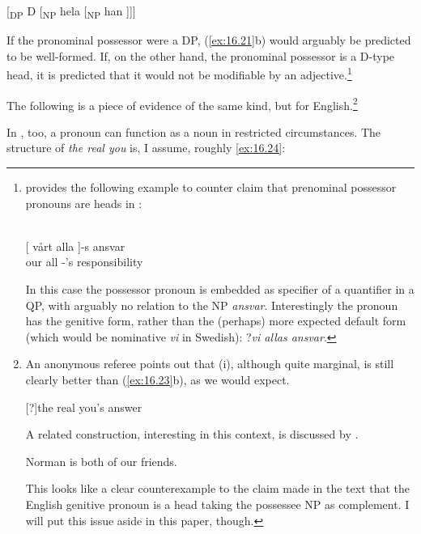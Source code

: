 \documentclass[output=paper]{langsci/langscibook}
\begin{document}
\ea\label{ex:16.22}
    {}[\textsubscript{DP} D [\textsubscript{NP} hela [\textsubscript{NP} han ]]]
\z

If the pronominal possessor were a DP, (\ref{ex:16.21}b) would arguably be
predicted to be well-formed. If, on the other hand, the pronominal possessor is
a D-type head, it is predicted that it would not be modifiable by an
adjective.\footnote{\citet[227--230]{Julien2005} provides the following example
    to counter  claim that prenominal possessor pronouns
    are heads in :

\begin{exe}
    \\
	\gll {}[ vårt alla ]-s ansvar \\
        {} our  all \hphantom{]}-’s  responsibility\\
\end{exe}

In this case the possessor pronoun is embedded as specifier of a quantifier in
a QP, with arguably no relation to the NP \emph{ansvar}.  Interestingly the
pronoun has the genitive form, rather than the (perhaps) more expected default
form (which would be nominative \emph{vi} in Swedish):
?\emph{vi allas ansvar}.}

The following is a piece of evidence of the same kind, but for
English.\footnote{An anonymous referee points out that (i), although quite
    marginal, is still clearly better than (\ref{ex:16.23}b), as we would expect.

\begin{exe}
    [?]{the real you’s answer}
\end{exe}

A related construction, interesting in this context, is discussed by
\textcite{TsoulasWoods2019}.

\begin{exe}
     Norman is both of our friends.
\end{exe}

This looks like a clear counterexample to the claim made in the text that the
English genitive pronoun is a head taking the possessee NP as
complement. I will put this issue aside in this paper, though.}

\ea\label{ex:16.23}
	\z
\z

In , too, a pronoun can function as a noun in restricted circumstances.
The structure of \emph{the real you} is, I assume, roughly \eqref{ex:16.24}:
\end{document}
